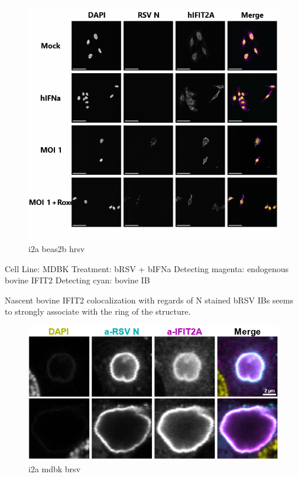 \begin{figure}
    \centering
    \includegraphics[width=1\linewidth]{09. Chapter 4//Figs//01. I2A/07. i2a beas2b hrsv.png}
    \caption[i2a beas2b hrsv]{i2a beas2b hrsv}
    \label{i2a beas2b hrsv}
\end{figure}

Cell Line: MDBK \newline
Treatment: bRSV + bIFNa \newline
Detecting magenta: endogenous bovine IFIT2  \newline
Detecting cyan: bovine IB \newline

Nascent bovine IFIT2 colocalization with regards of N stained bRSV IBs seems to strongly associate with the ring of the structure.

\begin{figure}
    \centering
    \includegraphics[width=1\linewidth]{09. Chapter 4//Figs//01. I2A/08. i2a mdbk brsv.png}
    \caption[i2a mdbk brsv]{i2a mdbk brsv}
    \label{i2a mdbk brsv}
\end{figure}

